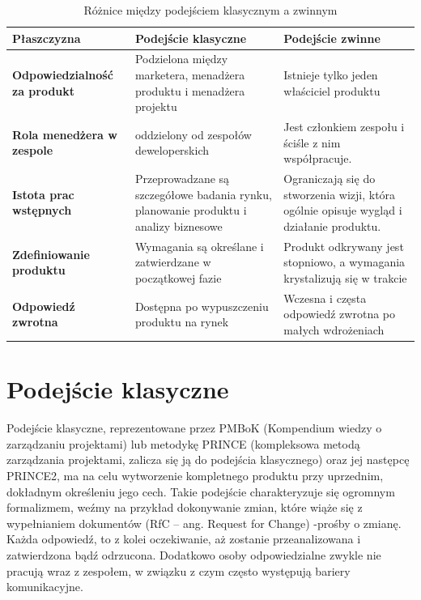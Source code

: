 \begin{table}
\centering\caption{ Różnice między podejściem klasycznym a zwinnym
\label{tabela:roznice}}
\begin{tabular}{|l|p{5cm}|p{5cm}|}%
\hline
\textbf{Płaszczyzna} &\textbf{ Podejście klasyczne} & \textbf{Podejście zwinne} \\
\hline
\textbf{Odpowiedzialność
za produkt}
 & Podzielona między marketera,
 menadżera produktu i menadżera projektu & Istnieje tylko jeden właściciel produktu \\
\hline
\textbf{Rola menedżera
w zespole} & oddzielony od zespołów deweloperskich & Jest członkiem zespołu i ściśle z nim współpracuje.\\
\hline
\textbf{Istota prac wstępnych} & Przeprowadzane są szczegółowe badania rynku, planowanie produktu i analizy biznesowe
& Ograniczają się do stworzenia wizji, która ogólnie opisuje wygląd i działanie produktu. \\
\hline
\textbf{Zdefiniowanie
produktu} & Wymagania są określane i zatwierdzane w początkowej fazie
& Produkt odkrywany jest stopniowo, a wymagania krystalizują się w trakcie
\\
\hline
\textbf{Odpowiedź zwrotna} & Dostępna po wypuszczeniu produktu na rynek
& Wczesna i częsta odpowiedź zwrotna po małych wdrożeniach
\\
\hline
\end{tabular}
\end{table}
\newpage

\section{Podejście klasyczne}

Podejście klasyczne, reprezentowane przez PMBoK (Kompendium wiedzy o zarządzaniu projektami) lub metodykę PRINCE (kompleksowa metodą zarządzania projektami, zalicza się ją do podejścia klasycznego) oraz jej następcę PRINCE2, ma na celu wytworzenie kompletnego produktu przy uprzednim, dokładnym określeniu jego cech. Takie podejście charakteryzuje się ogromnym formalizmem, weźmy na przykład dokonywanie zmian, które wiąże się z wypełnianiem dokumentów (RfC – ang. Request for Change) -prośby o zmianę. Każda odpowiedź, to z kolei oczekiwanie, aż zostanie przeanalizowana i zatwierdzona bądź odrzucona. Dodatkowo osoby odpowiedzialne zwykle nie pracują wraz z zespołem, w związku z czym często występują bariery komunikacyjne.\cite{www_tradycyjne_projekty}


